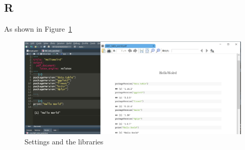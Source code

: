 \subsection{R}

As shown in Figure~\ref{fig:R_setting}

\begin{figure}[h]
    \centering
    \includegraphics[width=0.9 \textwidth]{image/R.png}
    \caption{Settings and the libraries}
    \label{fig:R_setting}
\end{figure}